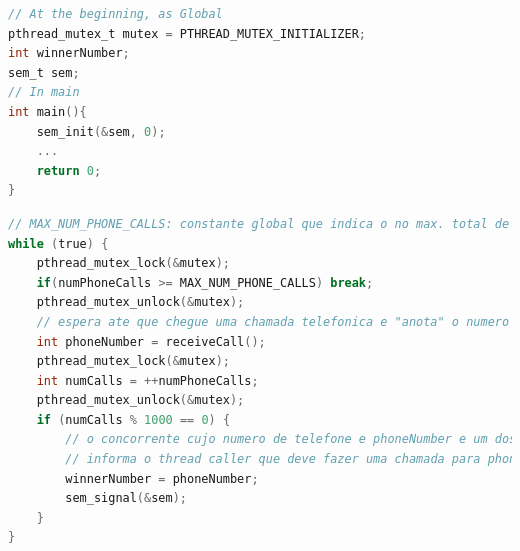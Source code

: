 \documentclass{sope}
\begin{document}
\begin{lstlisting}[language=C,basicstyle=\ttfamily\small]
// At the beginning, as Global
pthread_mutex_t mutex = PTHREAD_MUTEX_INITIALIZER;
int winnerNumber;
sem_t sem;
// In main
int main(){
    sem_init(&sem, 0);
    ...
    return 0;
}
\end{lstlisting}

\begin{lstlisting}[language=C,basicstyle=\ttfamily\small]
// MAX_NUM_PHONE_CALLS: constante global que indica o no max. total de chamadas
while (true) {
    pthread_mutex_lock(&mutex);
    if(numPhoneCalls >= MAX_NUM_PHONE_CALLS) break;
    pthread_mutex_unlock(&mutex);
    // espera ate que chegue uma chamada telefonica e "anota" o numero de telefone
    int phoneNumber = receiveCall();
    pthread_mutex_lock(&mutex);
    int numCalls = ++numPhoneCalls;
    pthread_mutex_unlock(&mutex);
    if (numCalls % 1000 == 0) {
        // o concorrente cujo numero de telefone e phoneNumber e um dos vencedores
        // informa o thread caller que deve fazer uma chamada para phoneNumber
        winnerNumber = phoneNumber;
        sem_signal(&sem);
    }
}
\end{lstlisting}
\end{document}
